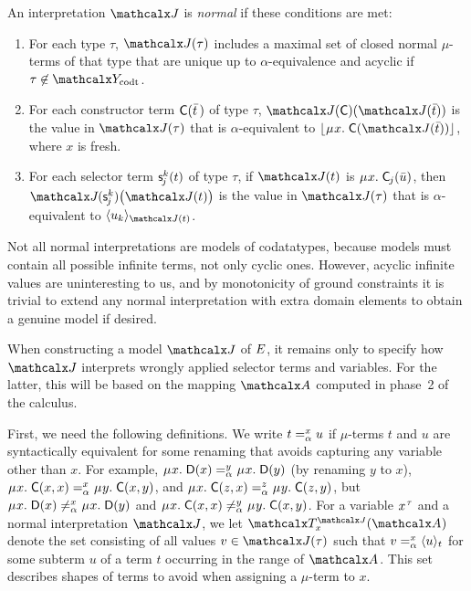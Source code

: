 \begin{definition}
\afterDot%
\label{def:norm-interpretation}%
\rm
An interpretation $\J$ is \emph{normal} if these conditions are met:
\begin{enumerate}
\item
For each type $\tau$,
$\interp{\J}{\tau}$ includes a maximal set of closed normal $\mu$-terms of that type that are
unique up to $\alpha$-equivalence and acyclic if $\tau \not\in \Codata$.
\item
For each constructor term $\const{C}( \vec t \,)$ of type $\tau$,
$\interp{\J}{\const{C}}( \interp{\J}{\vec t} )$ is the value
in $\interp{\J}{\tau}$ that is $\alpha$-equivalent to
$\nf{\MU x.\; \const{C}( \interp{\J}{\vec t} )}$, where $x$ is fresh.
\item
For each selector term $\const s^k_{\negvthinspace j}( t )$ of type $\tau$, %
if $\interp{\J}{t}$ is $\MU x.\; \const{C}_{\negvthinspace j}( \vec u )$, 
then $\J\negvvthinspace( \const s^k_{\negvthinspace j} )\bigl( \interp{\J}{t} \bigr)$ is the value
in $\interp{\J}{\tau}$ that is $\alpha$-equivalent to
$\expand{\interp{\J}{t}}{u_k}$.
\end{enumerate}
\end{definition}

Not all normal interpretations are models of codatatypes, because
models must contain all possible infinite terms, not only cyclic ones. However,
acyclic infinite values are uninteresting to us, and by monotonicity of ground
constraints it is trivial to extend any normal interpretation with extra
domain elements to obtain a genuine model if desired. %

When constructing a model $\J$ of $\Ec$,
it remains only to specify how $\J$ interprets wrongly applied selector terms and variables.
For the latter, this will be based on the mapping $\Val$ computed in phase~2 of the calculus.

{
First, we need the following definitions.
We write $t \vsimv{x} u$ if $\mu$-terms $t$ and $u$ are syntactically equivalent
for some renaming that avoids capturing any variable other than $x$.
For example,
$\MU x.\; \const{D}( x ) \vsimv{y} \MU x.\; \const{D}( y )$
(by renaming $y$ to $x$),
$\MU x.\; \const{C}( x, x ) \vsimv{x} \MU y.\; \const{C}( x, y )$, and
$\MU x.\; \const{C}( z, x ) \vsimv{z} \MU y.\; \const{C}( z, y )$,
but
$\MU x.\; \const{D}( x ) \not\vsimv{x} \MU x.\; \const{D}( y )$ and
$\MU x.\; \const{C}( x, x ) \not\vsimv{y} \MU y.\; \const{C}( x, y )$.
For a variable $x\typ{\tau}$ and a normal interpretation $\J$,
we let $\Terms^{\smash{\J}}_x( \Val )$ denote the set consisting of all values
$v \in \interp{\J}{\tau}$
such that $v \vsimv{x} \expand{t}{u}$ for some subterm $u$ of a term $t$
occurring in the range of $\Val$. This set describes shapes of terms to avoid
when assigning a $\mu$-term to $x$.

}

